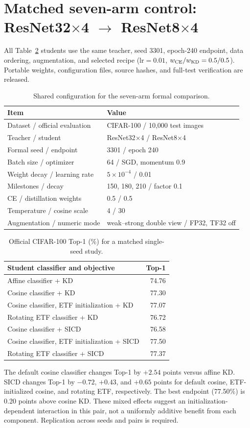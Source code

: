 \documentclass[10pt]{article}
\begin{document}
\section{Matched seven-arm control: ResNet32$\times$4 $\rightarrow$ ResNet8$\times$4}
All Table~\ref{tab:seven} students use the same teacher, seed 3301, epoch-240 endpoint, data ordering, augmentation, and selected recipe ($\mathrm{lr}=0.01$, $w_{\rm CE}/w_{\rm KD}=0.5/0.5$). Portable weights, configuration files, source hashes, and full-test verification are released.
\begin{table}[h]
\centering
\caption{Shared configuration for the seven-arm formal comparison.}
\label{tab:seven-config}
\begin{tabular}{ll}
\toprule
Item & Value \\
\midrule
Dataset / official evaluation & CIFAR-100 / 10,000 test images \\
Teacher / student & ResNet32$\times$4 / ResNet8$\times$4 \\
Formal seed / endpoint & 3301 / epoch 240 \\
Batch size / optimizer & 64 / SGD, momentum 0.9 \\
Weight decay / learning rate & $5\times10^{-4}$ / 0.01 \\
Milestones / decay & 150, 180, 210 / factor 0.1 \\
CE / distillation weights & 0.5 / 0.5 \\
Temperature / cosine scale & 4 / 30 \\
Augmentation / numeric mode & weak--strong double view / FP32, TF32 off \\
\bottomrule
\end{tabular}
\end{table}
\begin{table}[h]
\centering
\caption{Official CIFAR-100 Top-1 (\%) for a matched single-seed study.}
\label{tab:seven}
\begin{tabular}{lr}
\toprule
Student classifier and objective & Top-1 \\
\midrule
Affine classifier + KD & 74.76 \\
Cosine classifier + KD & 77.30 \\
Cosine classifier, ETF initialization + KD & 77.07 \\
Rotating ETF classifier + KD & 76.72 \\
Cosine classifier + SICD & 76.58 \\
Cosine classifier, ETF initialization + SICD & 77.50 \\
Rotating ETF classifier + SICD & 77.37 \\
\bottomrule
\end{tabular}
\end{table}
The default cosine classifier changes Top-1 by $+2.54$ points versus affine KD. SICD changes Top-1 by $-0.72$, $+0.43$, and $+0.65$ points for default cosine, ETF-initialized cosine, and rotating ETF, respectively. The best endpoint (77.50\%) is 0.20 points above cosine KD. These mixed effects suggest an initialization-dependent interaction in this pair, not a uniformly additive benefit from each component. Replication across seeds and pairs is required.
\end{document}
